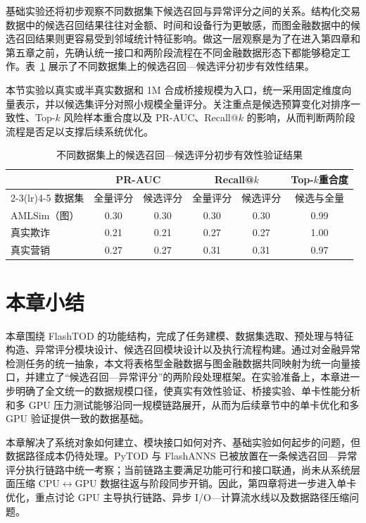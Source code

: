基础实验还将初步观察不同数据集下候选召回与异常评分之间的关系。结构化交易数据中的候选召回结果往往对金额、时间和设备行为更敏感，而图金融数据中的候选召回结果则更容易受到邻域统计特征影响。做这一层观察是为了在进入第四章和第五章之前，先确认统一接口和两阶段流程在不同金融数据形态下都能够稳定工作。表~\ref{tab:prelim-effectiveness} 展示了不同数据集上的候选召回---候选评分初步有效性结果。

本节实验以真实或半真实数据和 1M 合成桥接规模为入口，统一采用固定维度向量表示，并以候选集评分对照小规模全量评分。关注重点是候选预算变化对排序一致性、Top-$k$ 风险样本重合度以及 PR-AUC、Recall@$k$ 的影响，从而判断两阶段流程是否足以支撑后续系统优化。

\begin{table}[!htbp]
  \centering
  \caption{不同数据集上的候选召回---候选评分初步有效性验证结果}
  \label{tab:prelim-effectiveness}
  \small
  \begin{tabular}{lccccc}
    \toprule
    & \multicolumn{2}{c}{PR-AUC} & \multicolumn{2}{c}{Recall@$k$} & Top-$k$重合度 \\
    \cmidrule(lr){2-3}\cmidrule(lr){4-5}
    数据集 & 全量评分 & 候选评分 & 全量评分 & 候选评分 & 候选与全量 \\
    \midrule
    AMLSim（图） & 0.30 & 0.30 & 0.30 & 0.30 & 0.99 \\
    真实欺诈 & 0.21 & 0.21 & 0.27 & 0.27 & 1.00 \\
    真实营销 & 0.27 & 0.27 & 0.31 & 0.31 & 0.97 \\
    \bottomrule
  \end{tabular}
\end{table}

\FloatBarrier

\section{本章小结}

本章围绕 FlashTOD 的功能结构，完成了任务建模、数据集选取、预处理与特征构造、异常评分模块设计、候选召回模块设计以及执行流程构建。通过对金融异常检测任务的统一抽象，本文将表格型金融数据与图金融数据共同映射为统一向量接口，并建立了``候选召回---异常评分''的两阶段处理框架。在实验准备上，本章进一步明确了全文统一的数据规模口径，使真实有效性验证、桥接实验、单卡性能分析和多 GPU 压力测试能够沿同一规模链路展开，从而为后续章节中的单卡优化和多 GPU 验证提供一致的数据基础。

\begingroup
{}
本章解决了系统对象如何建立、模块接口如何对齐、基础实验如何起步的问题，但数据路径成本仍待处理。PyTOD 与 FlashANNS 已被放置在一条候选召回---异常评分执行链路中统一考察；当前链路主要满足功能可行和接口联通，尚未从系统层面压缩 CPU$\leftrightarrow$GPU 数据往返与阶段同步开销。因此，第四章将进一步进入单卡优化，重点讨论 GPU 主导执行链路、异步 I/O---计算流水线以及数据路径压缩问题。\par
\endgroup
